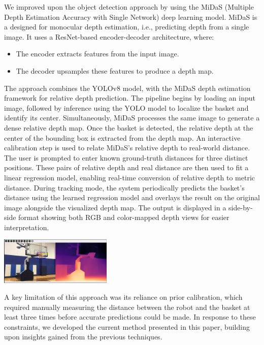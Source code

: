 \documentclass[a4paper]{article}
\begin{document}
\begin{multicols}{2}
\par \noindent
We improved upon the object detection approach by using the MiDaS (Multiple Depth Estimation Accuracy with Single Network) deep learning model. MiDaS is a designed for monocular depth estimation, i.e., predicting depth from a single image. It uses a ResNet-based encoder-decoder architecture, where:
\begin{itemize}
    \item The encoder extracts features from the input image.
    \item The decoder upsamples these features to produce a depth map.
\end{itemize}
The approach combines the YOLOv8 model, with the MiDaS depth estimation framework for relative depth prediction.
The pipeline begins by loading an input image, followed by inference using the YOLO model to localize the basket and identify its center. Simultaneously, MiDaS processes the same image to generate a dense relative depth map. Once the basket is detected, the relative depth at the center of the bounding box is extracted from the depth map.
An interactive calibration step is used to relate MiDaS's relative depth to real-world distance. The user is prompted to enter known ground-truth distances for three distinct positions. These pairs of relative depth and real distance are then used to fit a linear regression model, enabling real-time conversion of relative depth to metric distance.
During tracking mode, the system periodically predicts the basket's distance using the learned regression model and overlays the result on the original image alongside the visualized depth map. The output is displayed in a side-by-side format showing both RGB and color-mapped depth views for easier interpretation.

{ \centering
  \includegraphics[width=0.4\textwidth]{results/midas.png}\\
  \label{fig:basket_midas}
}

A key limitation of this approach was its reliance on prior calibration, which required manually measuring the distance between the robot and the basket at least three times before accurate predictions could be made. In response to these constraints, we developed the current method presented in this paper, building upon insights gained from the previous techniques.


\end{multicols}
\end{document}
